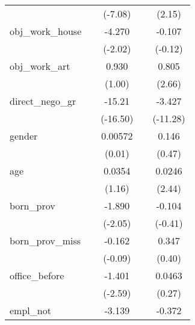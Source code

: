 {\begin{tabular}{l*{4}{c}}
            &                     &     (-7.08)         &                     &      (2.15)         \\
[1em]
obj\_work\_house&                     &      -4.270\sym{*}  &                     &      -0.107         \\
            &                     &     (-2.02)         &                     &     (-0.12)         \\
[1em]
obj\_work\_art&                     &       0.930         &                     &       0.805\sym{**} \\
            &                     &      (1.00)         &                     &      (2.66)         \\
[1em]
direct\_nego\_gr&                     &      -15.21\sym{***}&                     &      -3.427\sym{***}\\
            &                     &    (-16.50)         &                     &    (-11.28)         \\
[1em]
gender      &                     &     0.00572         &                     &       0.146         \\
            &                     &      (0.01)         &                     &      (0.47)         \\
[1em]
age         &                     &      0.0354         &                     &      0.0246\sym{*}  \\
            &                     &      (1.16)         &                     &      (2.44)         \\
[1em]
born\_prov   &                     &      -1.890\sym{*}  &                     &      -0.104         \\
            &                     &     (-2.05)         &                     &     (-0.41)         \\
[1em]
born\_prov\_miss&                     &      -0.162         &                     &       0.347         \\
            &                     &     (-0.09)         &                     &      (0.40)         \\
[1em]
office\_before&                     &      -1.401\sym{**} &                     &      0.0463         \\
            &                     &     (-2.59)         &                     &      (0.27)         \\
[1em]
empl\_not    &                     &      -3.139\sym{**} &                     &      -0.372         \\

\end{tabular}}
